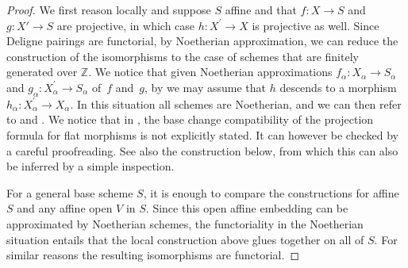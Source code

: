 \documentclass[11pt]{article}
\theoremstyle{plain}
\theoremstyle{definition}
\newcommand{\ZBbb}{\mathbb Z}
\begin{document}
\begin{proof}

We first reason locally and suppose $S$ affine and that $f \colon X \to S$ and $g \colon X' \to S$ are projective, in which case $h\colon X^{\prime}\to X$ is projective as well. Since Deligne pairings are functorial, by Noetherian approximation, we can reduce the construction of the isomorphisms to the case of schemes that are finitely generated over $\ZBbb$. We notice that given Noetherian approximations $f_{\alpha}\colon X_{\alpha}\to S_{\alpha}$ and $g_{\alpha}\colon X^{\prime}_{\alpha}\to S_{\alpha}$ of~$f$ and~$g$, by \cite[\href{https://stacks.math.columbia.edu/tag/01ZM}{01ZM}]{stacks-project} we may assume that $h$ descends to a morphism $h_{\alpha}\colon X^{\prime}_{\alpha}\to X_{\alpha}$. In this situation all schemes are Noetherian, and we can then refer to \cite[\textsection IV.2]{Elkikfib} and \cite[]{Munoz}. We notice that in \cite{Munoz}, the base change compatibility of the projection formula for flat morphisms is not explicitly stated. It can however be checked by a careful proofreading. See also the construction below, from which this can also be inferred by a simple inspection.

For a general base scheme $S$, it is enough to compare the constructions for affine~$S$ and any affine open $V$ in $S$. Since this open affine embedding can be approximated by Noetherian schemes, the functoriality in the Noetherian situation entails that the local construction above glues together on all of $S$. For similar reasons the resulting isomorphisms are functorial.


\end{proof}
\end{document}
